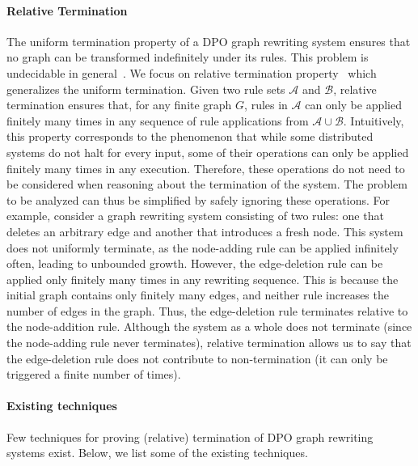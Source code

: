 \paragraph{Relative Termination}
The uniform termination property of a DPO graph rewriting system ensures that no graph can be transformed indefinitely under its rules. This problem is undecidable in general~\cite{plump1998terminationundecidable}.
We focus on relative termination property~\cite{klop1987term,geser1990relative} which generalizes the uniform termination.
 Given two rule sets \( \mathcal{A} \) and \( \mathcal{B} \), relative termination ensures that, for any finite graph $G$,
rules in $\mathcal{A}$ can only be applied finitely many times in any sequence of rule applications from $\mathcal{A} \cup \mathcal{B}$. Intuitively, this property corresponds to the phenomenon that while some distributed systems do not halt for every input, some of their operations can only be applied finitely many times in any execution. 
Therefore, these operations do not need to be considered when reasoning about the termination of the system. The problem to be analyzed can thus be simplified by safely ignoring these operations.
For example, consider a graph rewriting system consisting of two rules: one that deletes an arbitrary edge and another that introduces a fresh node. This system does not uniformly terminate, as the node-adding rule can be applied infinitely often, leading to unbounded growth. However, the edge-deletion rule can be applied only finitely many times in any rewriting sequence. This is because the initial graph contains only finitely many edges, and neither rule increases the number of edges in the graph. Thus, the edge-deletion rule terminates relative to the node-addition rule.
Although the system as a whole does not terminate (since the node-adding rule never terminates), relative termination allows us to say that the edge-deletion rule does not contribute to non-termination (it can only be triggered a finite number of times).

\paragraph{Existing techniques}
Few techniques for proving (relative) termination of DPO graph rewriting systems exist. Below, we list some of the existing techniques.

